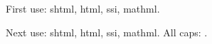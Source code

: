 \documentclass[12pt]{article}
\begin{document}
\tableofcontents
\section{}
First use: \gls{shtml}, \gls{html}, \gls{ssi}, \gls{mathml}. 

Next use: \gls{shtml}, \gls{html}, \gls{ssi}, \gls{mathml}. All caps: . 

\printunsrtglossaries 
\end{document}
